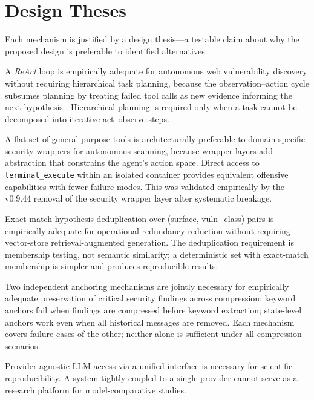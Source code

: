 \documentclass[12pt, a4paper, oneside, openany]{book}
\newcommand{\tool}[1]{\texttt{#1}}
\begin{document}
\section{Design Theses}
\label{sec:theses}

Each mechanism is justified by a design thesis---a testable claim about
why the proposed design is preferable to identified alternatives:

\begin{description}[leftmargin=1.5em, font=\bfseries]
  \item[T-1 --- ReAct Loop Adequacy:]
    A \textit{ReAct} loop is empirically adequate for autonomous web
    vulnerability discovery without requiring hierarchical task planning,
    because the observation--action cycle subsumes planning by treating
    failed tool calls as new evidence informing the next hypothesis
    \citep{yao2023react}.  Hierarchical planning is required only when
    a task cannot be decomposed into iterative act--observe steps.

  \item[T-2 --- Flat Toolset:]
    A flat set of general-purpose tools is architecturally preferable
    to domain-specific security wrappers for autonomous scanning,
    because wrapper layers add abstraction that constrains the agent's
    action space.  Direct access to \tool{terminal\_execute} within an
    isolated container provides equivalent offensive capabilities with
    fewer failure modes.  This was validated empirically by the v0.9.44
    removal of the security wrapper layer after systematic breakage.

  \item[T-3 --- Exact-Match Deduplication:]
    Exact-match hypothesis deduplication over (surface, vuln\_class)
    pairs is empirically adequate for operational redundancy reduction
    without requiring vector-store retrieval-augmented generation.
    The deduplication requirement is membership testing, not semantic
    similarity; a deterministic set with exact-match membership is
    simpler and produces reproducible results.

  \item[T-4 --- Dual Anchoring:]
    Two independent anchoring mechanisms are jointly necessary for
    empirically adequate preservation of critical security findings
    across compression: keyword anchors fail when findings are
    compressed before keyword extraction; state-level anchors work
    even when all historical messages are removed.  Each mechanism
    covers failure cases of the other; neither alone is
    sufficient under all compression scenarios.

  \item[T-5 --- Provider Abstraction:]
    Provider-agnostic LLM access via a unified interface
    \citep{litellm2023} is necessary for scientific reproducibility.
    A system tightly coupled to a single provider cannot serve as a
    research platform for model-comparative studies.
\end{description}
\end{document}
